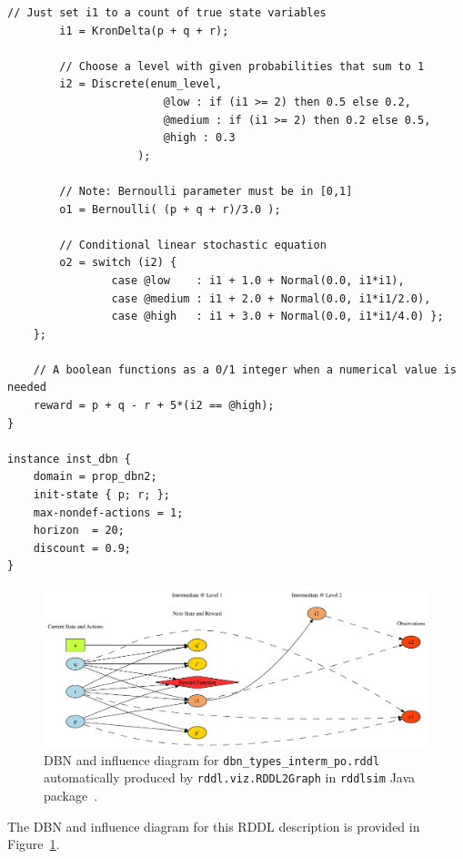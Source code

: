 \documentclass[11pt,a4paper]{article}
\begin{document}
\begin{lstlisting}[title=dbn\_types\_interm\_po.rddl]
		// Just set i1 to a count of true state variables
		i1 = KronDelta(p + q + r); 
		
		// Choose a level with given probabilities that sum to 1
		i2 = Discrete(enum_level, 
						@low : if (i1 >= 2) then 0.5 else 0.2,
						@medium : if (i1 >= 2) then 0.2 else 0.5,
						@high : 0.3
					);							
		
		// Note: Bernoulli parameter must be in [0,1]
		o1 = Bernoulli( (p + q + r)/3.0 ); 

		// Conditional linear stochastic equation
		o2 = switch (i2) {
				case @low    : i1 + 1.0 + Normal(0.0, i1*i1),  
				case @medium : i1 + 2.0 + Normal(0.0, i1*i1/2.0), 
				case @high   : i1 + 3.0 + Normal(0.0, i1*i1/4.0) };
	};
    	
	// A boolean functions as a 0/1 integer when a numerical value is needed
	reward = p + q - r + 5*(i2 == @high); 
}
        
instance inst_dbn {
	domain = prop_dbn2;	
	init-state { p; r; };
	max-nondef-actions = 1;
	horizon  = 20;
	discount = 0.9;
}
\end{lstlisting}

\begin{figure}[t!]
\hspace{-15mm} \includegraphics[scale=.9]{dbn_types_interm_po.pdf}
\caption{DBN and influence diagram 
for \texttt{dbn\_types\_interm\_po.rddl} automatically
produced by \texttt{rddl.viz.RDDL2Graph} in \texttt{rddlsim} Java 
package~\cite{rddlsim}.}
\label{fig:rddl2}
\end{figure}

The DBN and influence diagram for this RDDL description is provided in
Figure~\ref{fig:rddl2}.
\end{document}
